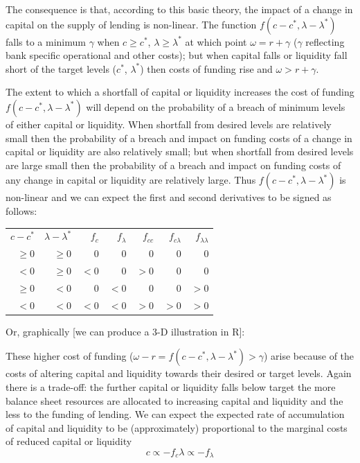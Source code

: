 \documentclass[
]{article}
\begin{document}
The consequence is that, according to this basic theory, the impact of a change in capital on the supply of lending is non-linear. The function \(f(c-c^\ast,\lambda-\lambda^\ast )\) falls to a minimum \(\gamma\) when \(c \geq c^\ast\), \(\lambda\geq\lambda^\ast\) at which point \(\omega=r+ \gamma\) (\(\gamma\) reflecting bank specific operational and other costs); but when capital falls or liquidity fall short of the target levels (\(c^\ast\), \(\lambda^\ast\)) then costs of funding rise and \(\omega >r+ \gamma\).

The extent to which a shortfall of capital or liquidity increases the cost of funding \(f(c-c^\ast,\lambda-\lambda^\ast)\) will depend on the probability of a breach of minimum levels of either capital or liquidity. When shortfall from desired levels are relatively small then the probability of a breach and impact on funding costs of a change in capital or liquidity are also relatively small; but when shortfall from desired levels are large small then the probability of a breach and impact on funding costs of any change in capital or liquidity are relatively large. Thus \(f(c-c^\ast,\lambda-\lambda^\ast)\) is non-linear and we can expect the first and second derivatives to be signed as follows:

\begin{center}
\begin{tabular}{ r r r r r r r}
$c-c^\ast$&$\lambda-\lambda^\ast$&$f_c$&$f_\lambda$&$f_{cc}$&$f_{c\lambda}$&$f_{\lambda\lambda}$\\
$\geq 0$&$\geq 0$&$0$&$0$&$0$&$0$&$0$\\
$<0$&$\geq 0$&$<0$&$0$&$>0$&$0$&$0$\\
$\geq 0$&$<0$&$0$&$<0$&$0$&$0$&$>0$\\
$<0$&$<0$&$<0$&$<0$&$>0$&$>0$&$>0$
\end{tabular}
\end{center}

Or, graphically {[}we can produce a 3-D illustration in R{]}:

These higher cost of funding (\(\omega - r = f(c-c^\ast,\lambda-\lambda^\ast )>\gamma\)) arise because of the costs of altering capital and liquidity towards their desired or target levels. Again there is a trade-off: the further capital or liquidity falls below target the more balance sheet resources are allocated to increasing capital and liquidity and the less to the funding of lending. We can expect the expected rate of accumulation of capital and liquidity to be (approximately) proportional to the marginal costs of reduced capital or liquidity
\[
c \propto -f_c
\lambda \propto -f_\lambda
\]
\end{document}
